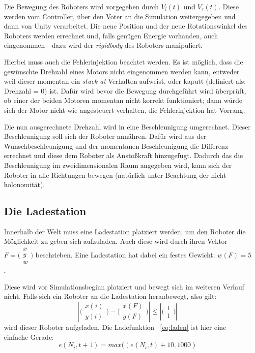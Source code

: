 Die Bewegung des Roboters wird vorgegeben durch $V_l(t)$ und $ V_r(t)$. Diese werden vom Controller, {\"{u}}ber den Voter an die Simulation
weitergegeben und dann von Unity verarbeitet. Die neue Position und der neue Rotationswinkel des Roboters werden errechnet und,
falls gen{\"{u}}gen Energie vorhanden, auch eingenommen - dazu wird der \textit{rigidbody} des Roboters manipuliert.

Hierbei muss auch die Fehlerinjektion beachtet werden. Es ist m{\"{o}}glich, dass die gew{\"{u}}nschte Drehzahl eines Motors nicht eingenommen werden
kann, entweder weil dieser momentan ein \textit{stuck-at}-Verhalten aufweist, oder kaputt (definiert als: Drehzahl = 0) ist. Daf{\"{u}}r wird bevor
die Bewegung durchgef{\"{u}}hrt wird {\"{u}}berpr{\"{u}}ft, ob einer der beiden Motoren momentan nicht korrekt funktioniert; dann w{\"{u}}rde sich der
Motor nicht wie angesteuert verhalten, die Fehlerinjektion hat Vorrang.

Die nun ausgerechnete Drehzahl wird in eine Beschleunigung umgerechnet. Dieser Beschleunigung soll sich der Roboter ann{\"{a}}hren. Daf{\"{u}}r wird
aus der Wunschbeschleunigung und der momentanen Beschleunigung die Differenz errechnet und diese dem Roboter als Ansto{\ss}kraft hinzugef{\"{u}}gt.
Dadurch das die Beschleunigung im zweidimensionalen Raum angegeben wird, kann sich der Roboter in alle Richtungen bewegen (nat{\"{u}}rlich unter
Beachtung der nicht-holonomit{\"{a}}t).

\subsection{Die Ladestation}\label{fuelstation}
Innerhalb der Welt muss eine Ladestation platziert werden, um den Roboter die M{\"{o}}glichkeit zu geben sich aufzuladen. Auch diese wird durch ihren Vektor $ F = \bigl(\begin{smallmatrix} x \\ y \\ w \end{smallmatrix}\bigr)$ beschrieben. Eine Ladestation hat dabei ein festes Gewicht: $ w(F) = 5 $.

Diese wird vor Simulationsbeginn platziert und bewegt sich im weiteren Verlauf nicht.
Falls sich ein Roboter an die Ladestation heranbewegt, also gilt: 
\begin{equation}\label{eq:dist}
 |\bigl(\begin{smallmatrix} x(i) \\ y(i) \end{smallmatrix}\bigr) - \bigl(\begin{smallmatrix} x(F) \\ y(F) \end{smallmatrix}\bigr)| \leq |\bigl(\begin{smallmatrix} 1 \\ 1 \end{smallmatrix}\bigr)|
\end{equation}
wird dieser Roboter aufgeladen. Die Ladefunktion ~\ref{eq:laden} ist hier eine einfache Gerade:
\begin{equation}
    \label{eq:laden}
	e(N_i, t + 1) = max((e(N_i, t) + 10, 1000) 
\end{equation}

